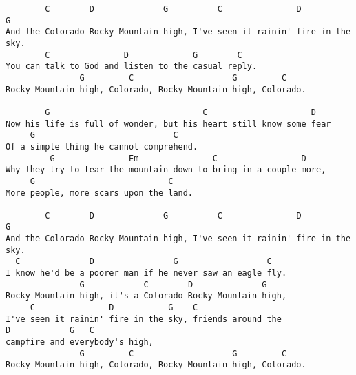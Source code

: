 \documentclass[leqno]{memoir}
\begin{document}
\begin{verbatim}
        C        D              G          C               D           G
And the Colorado Rocky Mountain high, I've seen it rainin' fire in the sky.
        C               D             G        C
You can talk to God and listen to the casual reply.
               G         C                    G         C
Rocky Mountain high, Colorado, Rocky Mountain high, Colorado.

        G                               C                     D
Now his life is full of wonder, but his heart still know some fear
     G                            C
Of a simple thing he cannot comprehend.
         G               Em               C                 D
Why they try to tear the mountain down to bring in a couple more,
     G                           C
More people, more scars upon the land.

        C        D              G          C               D           G
And the Colorado Rocky Mountain high, I've seen it rainin' fire in the sky.
  C              D                G                  C
I know he'd be a poorer man if he never saw an eagle fly.
               G            C        D              G
Rocky Mountain high, it's a Colorado Rocky Mountain high,
     C               D           G    C                 
I've seen it rainin' fire in the sky, friends around the
D            G   C
campfire and everybody's high,
               G         C                    G         C       
Rocky Mountain high, Colorado, Rocky Mountain high, Colorado.



\end{verbatim}
\newpage
\end{document}
